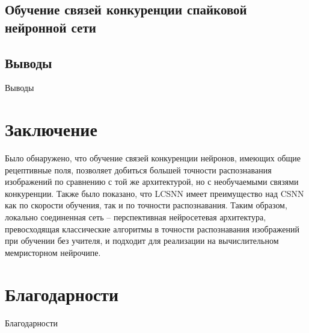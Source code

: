 \documentclass[a4paper]{article}
\begin{document}
\subsection{Обучение связей конкуренции спайковой нейронной сети}


\subsection{Выводы}
Выводы

\clearpage

\section{Заключение}
Было обнаружено, что обучение связей конкуренции нейронов, имеющих общие рецептивные поля, позволяет добиться большей точности распознавания изображений по сравнению с той же архитектурой, но с необучаемыми связями конкуренции. Также было показано, что LCSNN имеет преимущество над CSNN как по скорости обучения, так и по точности распознавания. Таким образом, локально соединенная сеть – перспективная нейросетевая архитектура, превосходящая классические алгоритмы в точности распознавания изображений при обучении без учителя, и подходит для реализации на вычислительном мемристорном нейрочипе.

\clearpage

\section{Благодарности}
Благодарности

\printbibliography
\end{document}
